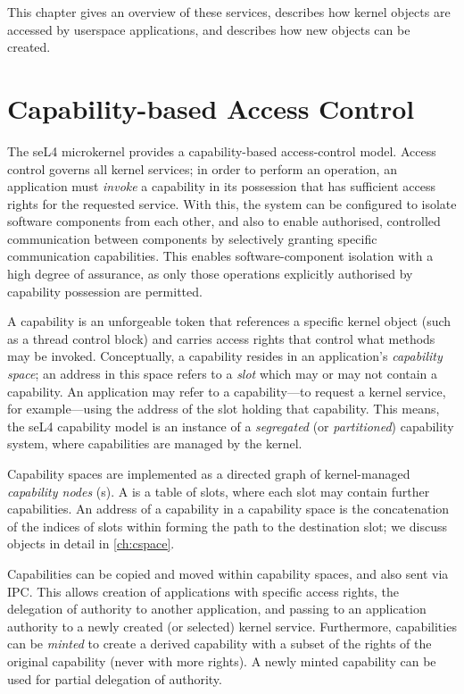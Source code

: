 This chapter gives an overview of these services, describes how kernel
objects are accessed by userspace applications, and describes how new
objects can be created.

\section{Capability-based Access Control}
\label{sec:cap-access-control}

The seL4 microkernel provides a capability-based access-control model.
Access control governs all kernel services; in order to perform an
operation, an application must \emph{invoke} a capability in its
possession that has sufficient access rights for the requested service.
With this, the system can be configured to isolate software components from
each other, and also to enable authorised, controlled communication
between components by selectively granting specific communication
capabilities.  This enables software-component isolation with a high
degree of assurance, as only those operations explicitly authorised by
capability possession are permitted.

A capability is an unforgeable token that references a specific kernel
object (such as a thread control block) and carries access rights that
control what methods may be invoked.
Conceptually, a capability resides in an application's \emph{capability
space}; an address in this space refers to a \emph{slot} which may or
may not contain a capability.  An application may refer to
a capability---to request a kernel service, for example---using the
address of the slot holding that capability.  This means, the seL4 
capability model is an instance of a \emph{segregated} (or \emph{partitioned})
capability system, where capabilities are managed by the kernel.

Capability spaces are implemented as a directed graph of kernel-managed
\emph{capability nodes} (s).  A  is a table of
slots, where each slot may contain further  capabilities. An
address of a capability in a capability space is the concatenation of the indices
of slots within  forming the path to the destination
slot; we discuss  objects in detail in \autoref{ch:cspace}.

Capabilities can be copied and moved within capability spaces, and
also sent via IPC. This allows creation of applications with specific
access rights, the delegation of authority to another application, and
passing to an application authority to a newly created (or selected)
kernel service. Furthermore, capabilities can be \emph{minted} to
create a derived capability with a subset of the rights of the
original capability (never with more rights). A newly minted
capability can be used for partial delegation of authority.

